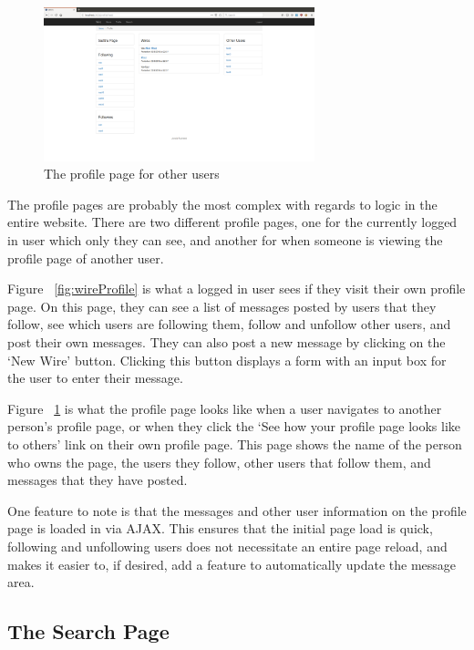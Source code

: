 \begin{figure}[H]
	\centering
	\includegraphics[width=0.7\textwidth]{final_report/pics/otherProfile.png}
	\caption{The profile page for other users}
	\label{fig:wireOtherProfile}
\end{figure}

The profile pages are probably the most complex with regards to logic in the
entire website. There are two different profile pages, one for the currently
logged in user which only they can see, and another for when someone is
viewing the profile page of another user.

Figure ~\ref{fig:wireProfile} is what a logged in user sees if they visit
their own profile page. On this page, they can see a list of messages posted
by users that they follow, see which users are following them, follow and
unfollow other users, and post their own messages. They can also post a
new message by clicking on the `New Wire' button. Clicking this button
displays a form with an input box for the user to enter their message.

Figure ~\ref{fig:wireOtherProfile} is what the profile page looks like
when a user navigates to another person's profile page, or when they click
the `See how your profile page looks like to others' link on their own
profile page. This page shows the name of the person who owns the page,
the users they follow, other users that follow them, and messages that
they have posted.

One feature to note is that the messages and other user information on
the profile page is loaded in via AJAX. This ensures that the initial
page load is quick, following and unfollowing users does not necessitate
an entire page reload, and makes it easier to, if desired, add a feature
to automatically update the message area.

\subsection{The Search Page}

